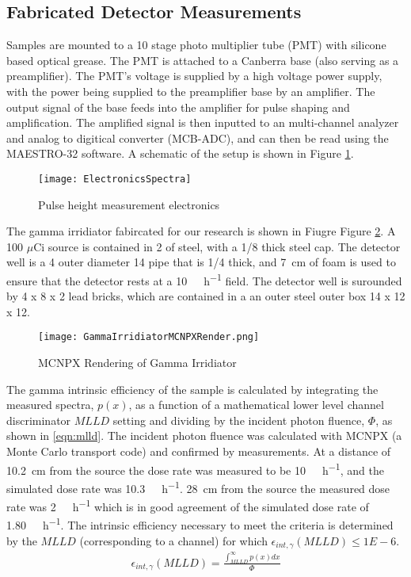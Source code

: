 \documentclass[draftcls,onecolumn]{IEEEtran}
\begin{document}
\subsection{Fabricated Detector Measurements}
Samples are mounted to a 10 stage photo multiplier tube (PMT) with silicone based optical grease. 
The PMT is attached to a Canberra base (also serving as a preamplifier). 
The PMT's voltage is supplied by a high voltage power supply, with the power being supplied to the preamplifier base by an amplifier.  
The output signal of the base feeds into the amplifier for pulse shaping and amplification. 
The amplified signal is then inputted to an multi-channel analyzer and analog to digitical converter (MCB-ADC), and can then be read using the MAESTRO-32 software. 
A schematic of the setup is shown in Figure \ref{fig:ElectronicsSpectra}.
\begin{figure}
	\centering
	\texttt{[image: ElectronicsSpectra]}
	\caption{Pulse height measurement electronics}
	\label{fig:ElectronicsSpectra}
\end{figure}

The gamma irridiator fabircated for our research is shown in Fiugre Figure \ref{fig:gammaIrridiator}.
A 100 $\mu$Ci  source is contained in \SI{2}{\in} of steel, with a \SI[fraction-function = \sfrac]{1/8}{\in} thick steel cap.
The detector well is a \SI{4}{\in} outer diameter \SI{14}{\in} pipe that is \SI{1/4}{\in} thick, and \SI{7}{\cm} of foam is used to ensure that the detector rests at a \SI{10}{\milli\roetgen\per\hour} field.
The detector well is surounded by \SI{4}{\in} x \SI{8}{\in} x \SI{2}{\in} lead bricks, which are contained in a an outer steel outer box \SI{14}{\in} x \SI{12}{\in} x \SI{12}{\in}.
\begin{figure}[ht]
	\centering
	\texttt{[image: GammaIrridiatorMCNPXRender.png]}
	\caption{MCNPX Rendering of Gamma Irridiator}
	\label{fig:gammaIrridiator}
\end{figure}
The gamma intrinsic efficiency of the sample is calculated by integrating the measured spectra, $p(x)$, as a function of a mathematical lower level channel discriminator $MLLD$ setting and dividing by the incident photon fluence, $\Phi$, as shown in \eqref{eqn:mlld}.
The incident photon fluence was calculated with MCNPX (a Monte Carlo transport code\cite{pelowitz_mcnpx_????}) and confirmed by measurements.
At a distance of \SI{10.2}{\cm} from the source the dose rate was measured to be \SI{10}{\milli\rem\per\hour}, and the simulated dose rate was \SI{10.3}{\milli\rem\per\hour}.
\SI{28}{\cm} from the source the measured dose rate was \SI{2}{\milli\rem\per\hour} which is in good agreement of the simulated dose rate of \SI{1.80}{\milli\rem\per\hour}.
The intrinsic efficiency necessary to meet the criteria is determined by the $MLLD$ (corresponding to a channel) for which $\epsilon_{int,\gamma} \left(MLLD\right) \le \si{1E-6}$.
\begin{align}
	\label{eqn:mlld}
	\epsilon_{int,\gamma} \left(MLLD\right) = \frac{\int_{MLLD}^\infty p(x)dx}{\Phi} 
\end{align}
\end{document}
